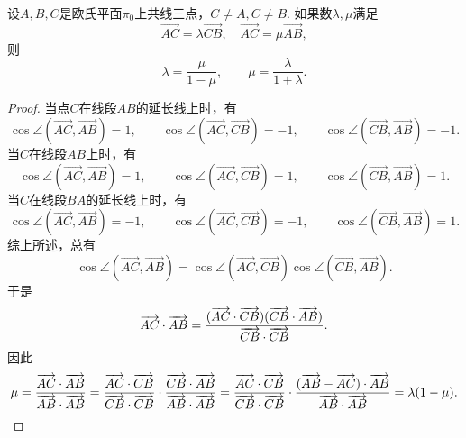\begin{proposition}
设\(A,B,C\)是欧氏平面\(\pi_0\)上共线三点，\(C \neq A, C \neq B\).
如果数\(\lambda,\mu\)满足\begin{equation*}
	\vec{AC} = \lambda \vec{CB},
	\quad
	\vec{AC} = \mu \vec{AB},
\end{equation*}
则\begin{equation*}
	\lambda = \frac{\mu}{1 - \mu},
	\qquad
	\mu = \frac{\lambda}{1 + \lambda}.
\end{equation*}
\begin{proof}
当点\(C\)在线段\(AB\)的延长线上时，有\begin{equation*}
	\cos\angle(\vec{AC},\vec{AB}) = 1,
	\qquad
	\cos\angle(\vec{AC},\vec{CB}) = -1,
	\qquad
	\cos\angle(\vec{CB},\vec{AB}) = -1.
\end{equation*}
当\(C\)在线段\(AB\)上时，有\begin{equation*}
	\cos\angle(\vec{AC},\vec{AB}) = 1,
	\qquad
	\cos\angle(\vec{AC},\vec{CB}) = 1,
	\qquad
	\cos\angle(\vec{CB},\vec{AB}) = 1.
\end{equation*}
当\(C\)在线段\(BA\)的延长线上时，有\begin{equation*}
	\cos\angle(\vec{AC},\vec{AB}) = -1,
	\qquad
	\cos\angle(\vec{AC},\vec{CB}) = -1,
	\qquad
	\cos\angle(\vec{CB},\vec{AB}) = 1.
\end{equation*}
综上所述，总有\begin{equation*}
	\cos\angle(\vec{AC},\vec{AB})
	= \cos\angle(\vec{AC},\vec{CB})
	\cos\angle(\vec{CB},\vec{AB}).
\end{equation*}
于是\begin{equation*}
	\overrightarrow{AC}\cdot\overrightarrow{AB}
	= \frac{
		(\overrightarrow{AC}\cdot\overrightarrow{CB})
		(\overrightarrow{CB}\cdot\overrightarrow{AB})
	}{
		\overrightarrow{CB}\cdot\overrightarrow{CB}
	}.
\end{equation*}
因此\begin{equation*}
	\mu
	= \frac{
		\overrightarrow{AC}\cdot\overrightarrow{AB}
	}{
		\overrightarrow{AB}\cdot\overrightarrow{AB}
	}
	= \frac{
		\overrightarrow{AC}\cdot\overrightarrow{CB}
	}{
		\overrightarrow{CB}\cdot\overrightarrow{CB}
	}
	\cdot \frac{
		\overrightarrow{CB}\cdot\overrightarrow{AB}
	}{
		\overrightarrow{AB}\cdot\overrightarrow{AB}
	}
	= \frac{
		\overrightarrow{AC}\cdot\overrightarrow{CB}
	}{
		\overrightarrow{CB}\cdot\overrightarrow{CB}
	}
	\cdot \frac{
		(\overrightarrow{AB} - \overrightarrow{AC})\cdot\overrightarrow{AB}
	}{
		\overrightarrow{AB}\cdot\overrightarrow{AB}
	}
	= \lambda (1 - \mu).
	\qedhere
\end{equation*}
\end{proof}
\end{proposition}

